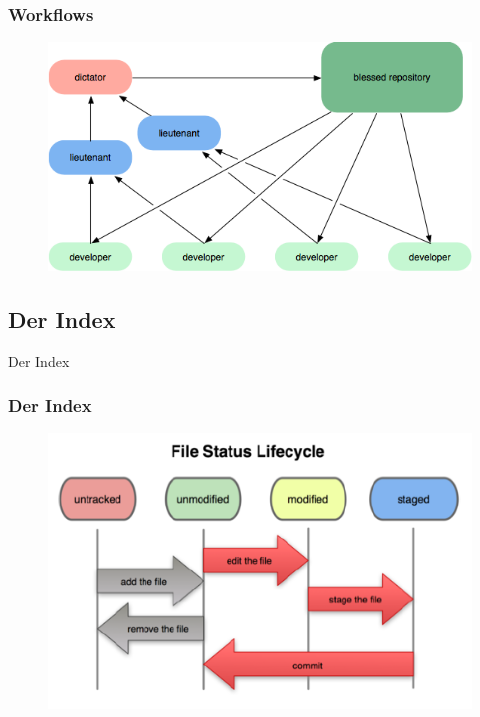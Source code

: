 \documentclass{beamer}
\begin{document}
\begin{frame}\frametitle{Workflows}
\begin{figure}
\includegraphics[scale=.9]{Bilder/workflow-c}
\end{figure}
\end{frame}

\subsection{Der Index}
\begin{frame}[c]
\begin{center}
\begin{Huge}
Der Index
\end{Huge}
\end{center}
\end{frame}

\begin{frame}\frametitle{Der Index}
\begin{figure}
\includegraphics[scale=.55]{Bilder/fileStatus.png}
\end{figure}
\end{frame}
\end{document}
